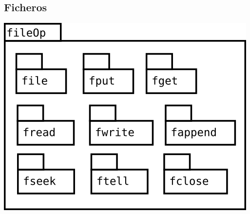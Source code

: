 \pagebreak
\subsection {Ficheros} 
\begin{center}
\includegraphics[scale=0.4]{fileOp-package.png} \\
\end{center}

